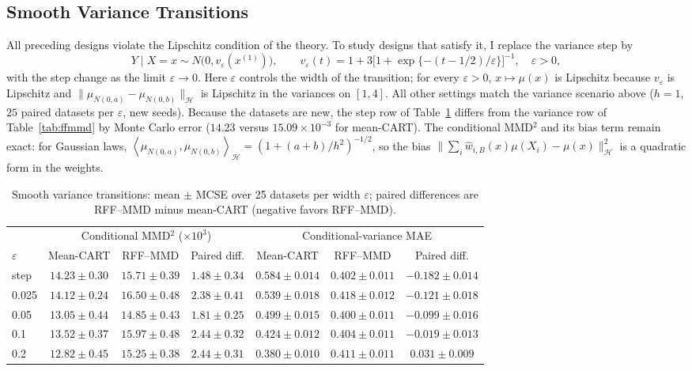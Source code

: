 \documentclass[12pt,a4paper]{article}
\newcommand{\calH}{\mathcal H}
\newcommand{\1}{\mathbf 1}
\newcommand{\ip}[2]{\left\langle#1,#2\right\rangle}
\begin{document}
\subsection{Smooth Variance Transitions}\label{sec:smooth}
All preceding designs violate the Lipschitz condition of the theory. To study designs that satisfy it, I replace the variance step by
\begin{equation}\label{eq:smoothvariance}
 Y\mid X=x\sim N\bigl(0,v_\varepsilon(x^{(1)})\bigr),\qquad
 v_\varepsilon(t)=1+3\bigl[1+\exp\{-(t-1/2)/\varepsilon\}\bigr]^{-1},\quad \varepsilon>0,
\end{equation}
with the step change as the limit $\varepsilon\to0$. Here $\varepsilon$ controls the width of the transition; for every $\varepsilon>0$, $x\mapsto\mu(x)$ is Lipschitz because $v_\varepsilon$ is Lipschitz and $\|\mu_{N(0,a)}-\mu_{N(0,b)}\|_{\calH}$ is Lipschitz in the variances on $[1,4]$. All other settings match the variance scenario above ($h=1$, $25$ paired datasets per $\varepsilon$, new seeds). Because the datasets are new, the step row of Table~\ref{tab:smooth} differs from the variance row of Table~\ref{tab:ffmmd} by Monte Carlo error ($14.23$ versus $15.09\times10^{-3}$ for mean-CART). The conditional MMD$^2$ and its bias term remain exact: for Gaussian laws, $\ip{\mu_{N(0,a)}}{\mu_{N(0,b)}}_{\calH}=(1+(a+b)/h^2)^{-1/2}$, so the bias $\|\sum_i\widehat w_{i,B}(x)\mu(X_i)-\mu(x)\|_{\calH}^2$ is a quadratic form in the weights.

\begin{table}[htbp]
\centering\footnotesize
\caption{Smooth variance transitions: mean $\pm$ MCSE over 25 datasets per width $\varepsilon$; paired differences are RFF--MMD minus mean-CART (negative favors RFF--MMD).}
\label{tab:smooth}
\begin{tabular}{@{}lcccccc@{}}
\toprule
& \multicolumn{3}{c}{Conditional MMD$^2$ ($\times10^3$)} & \multicolumn{3}{c}{Conditional-variance MAE} \\
\cmidrule(lr){2-4}\cmidrule(l){5-7}
$\varepsilon$ & Mean-CART & RFF--MMD & Paired diff. & Mean-CART & RFF--MMD & Paired diff. \\
\midrule
step & $14.23\pm0.30$ & $15.71\pm0.39$ & $1.48\pm0.34$ & $0.584\pm0.014$ & $0.402\pm0.011$ & $-0.182\pm0.014$ \\
0.025 & $14.12\pm0.24$ & $16.50\pm0.48$ & $2.38\pm0.41$ & $0.539\pm0.018$ & $0.418\pm0.012$ & $-0.121\pm0.018$ \\
0.05 & $13.05\pm0.44$ & $14.85\pm0.43$ & $1.81\pm0.25$ & $0.499\pm0.015$ & $0.400\pm0.011$ & $-0.099\pm0.016$ \\
0.1 & $13.52\pm0.37$ & $15.97\pm0.48$ & $2.44\pm0.32$ & $0.424\pm0.012$ & $0.404\pm0.011$ & $-0.019\pm0.013$ \\
0.2 & $12.82\pm0.45$ & $15.25\pm0.38$ & $2.44\pm0.31$ & $0.380\pm0.010$ & $0.411\pm0.011$ & $0.031\pm0.009$ \\
\bottomrule
\end{tabular}
\end{table}
\end{document}
